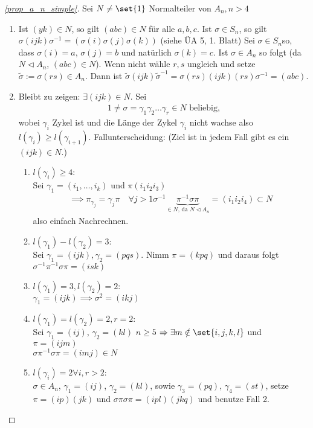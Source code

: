 \begin{proof}[\cref{prop_a_n_simple}]
	Sei $N \neq \set{1}$ Normalteiler von $A_n, n> 4$
	\begin{enumerate}
		\item Ist $(yk) \in N$, so gilt $(abc) \in N$ für alle $a,b,c$. Ist $\sigma \in S_n$, so gilt $\sigma(ijk)\sigma^{-1} = (\sigma(i)\sigma(j)\sigma(k))$ (siehe ÜA 5, 1. Blatt) Sei $\sigma \in S_n$so, dass $\sigma(i) = a$, $\sigma(j) = b$ und natürlich $\sigma(k) = c$. Ist $\sigma \in A_n$ so folgt (da $N \lhd A_n$, $(abc) \in N$). Wenn nicht wähle $r,s$ ungleich und setze $\tilde{\sigma}:= \sigma(rs) \in A_n$. %
		Dann ist $\tilde{\sigma}(ijk)\tilde{\sigma}^{-1} = \sigma(rs)(ijk)(rs)\sigma^{-1} = (abc)$.
		\item Bleibt zu zeigen: $\exists(ijk) \in N$. Sei
		\begin{align*}
			1 \neq \sigma=\gamma_1 \gamma_2 \dots \gamma_r \in N \text{ beliebig,}
		\end{align*} 
		wobei $\gamma_i$ Zykel ist und die Länge der Zykel $\gamma_i$ nicht wachse also $l(\gamma_i) \ge l(\gamma_{i+1})$. Fallunterscheidung: (Ziel ist in jedem Fall gibt es ein $(ijk) \in N$.)
		\begin{enumerate} %
			\item $l(\gamma_i) \ge 4$:\\
				Sei $\gamma_1 = (i_1, \dots, i_k)$ und $\pi(i_1 i_2 i_3)$ 
				\begin{align*}
					\implies \pi_{\gamma_j} = \gamma_j \pi \quad \forall j > 1				\sigma^{-1}\underbrace{\pi^{-1}\sigma \pi}_{\in N\text{, da } N \lhd A_n} = (i_1 i_2 i_4) \subset N
				\end{align*}
				also einfach Nachrechnen.
			\item $l(\gamma_1) - l(\gamma_2) = 3$:\\
			Sei $\gamma_1=(ijk), \gamma_2 = (pqs)$. Nimm $\pi = (kpq)$ und daraus folgt $\sigma^{-1}\pi^{-1}\sigma\pi = (isk)$
			\item $l(\gamma_1) = 3, l(\gamma_2) = 2$:\\
			$\gamma_1 = (ijk) \implies \sigma^{2} = (ikj)$
			\item $l(\gamma_1) = l(\gamma_2) = 2, r = 2$:\\
			Sei $\gamma_1 = (ij)$, $\gamma_2 = (kl)$ $n \ge 5$ $\implies \exists m \notin \set{i,j,k,l}$ und $\pi = (ijm)$\\
			$\sigma \pi^{-1}\sigma\pi = (imj) \in N$
			\item $l(\gamma_i) = 2 \forall i, r > 2$:\\
			$\sigma \in A_n$, $\gamma_1 =(ij)$, $\gamma_2 = (kl)$, sowie $\gamma_3 = (pq)$, $\gamma_4 = (st)$, setze $\pi = (ip)(jk)$ und $\sigma\pi \sigma \pi = (ipl)(jkq)$ und benutze Fall 2.
		\end{enumerate}
	\end{enumerate}
\end{proof}

